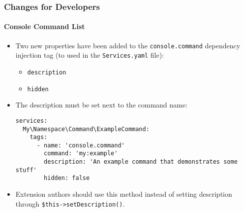 %

\begin{frame}[fragile]
	\frametitle{Changes for Developers}
	\framesubtitle{Console Command List}


	\begin{itemize}
		\item Two new properties have been added to the \texttt{console.command}
			dependency injection tag (to used in the \texttt{Services.yaml} file):
			\begin{itemize}
				\item \texttt{description}
				\item \texttt{hidden}
			\end{itemize}
			\vspace{0.2cm}
		\item The description must be set next to the command name:
\begin{lstlisting}
services:
  My\Namespace\Command\ExampleCommand:
    tags:
      - name: 'console.command'
        command: 'my:example'
        description: 'An example command that demonstrates some stuff'
        hidden: false
\end{lstlisting}

		\item Extension authors should use this method instead of setting
			description through \texttt{\$this->setDescription()}.

	\end{itemize}

\end{frame}


